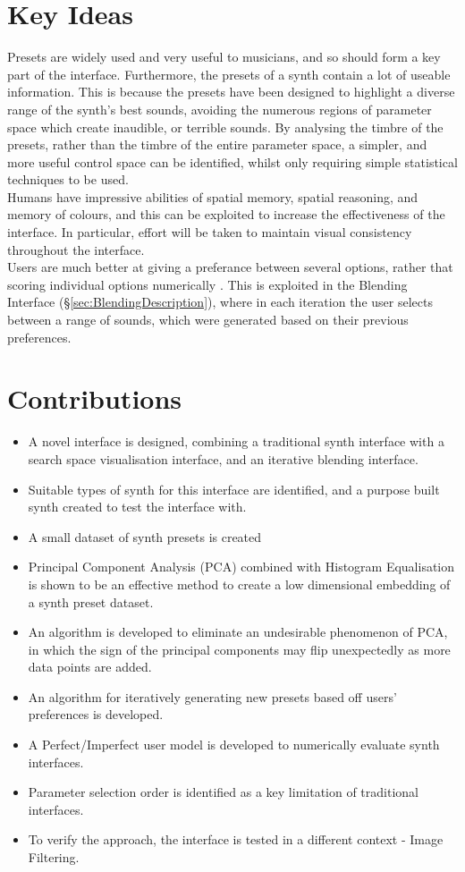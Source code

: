\documentclass[11pt, oneside]{report}   	%
\begin{document}
\section{Key Ideas}
Presets are widely used and very useful to musicians, and so should form a key part of the interface. Furthermore, the presets of a synth contain a lot of useable information. This is because the presets have been designed to highlight a diverse range of the synth's best sounds, avoiding the numerous regions of parameter space which create inaudible, or terrible sounds. By analysing the timbre of the presets, rather than the timbre of the entire parameter space, a simpler, and more useful control space can be identified, whilst only requiring simple statistical techniques to be used.\\
%
Humans have impressive abilities of spatial memory, spatial reasoning, and memory of colours, and this can be exploited to increase the effectiveness of the interface. In particular, effort will be taken to maintain visual consistency throughout the interface.\\
%
Users are much better at giving a preferance between several options, rather that scoring individual options numerically \cite{RatingRanking, PreferenceGallery}. This is exploited in the Blending Interface (\S \ref{sec:BlendingDescription}), where in each iteration the user selects between a range of sounds, which were generated based on their previous preferences.
%
\section{Contributions}
\begin{itemize}
	\setlength\itemsep{-1.0em}
	\item A novel interface is designed, combining a traditional synth interface with a search space visualisation interface, and an iterative blending interface.
	\item Suitable types of synth for this interface are identified, and a purpose built synth created to test the interface with.
	\item A small dataset of synth presets is created
	\item Principal Component Analysis (PCA) combined with Histogram Equalisation is shown to be an effective method to create a low dimensional embedding of a synth preset dataset.
	\item An algorithm is developed to eliminate an undesirable phenomenon of PCA, in which the sign of the principal components may flip unexpectedly as more data points are added.
	\item An algorithm for iteratively generating new presets based off users' preferences is developed.
	\item A Perfect/Imperfect user model is developed to numerically evaluate synth interfaces.
	\item Parameter selection order is identified as a key limitation of traditional interfaces.
	\item To verify the approach, the interface is tested in a different context - Image Filtering.
\end{itemize}
\end{document}
